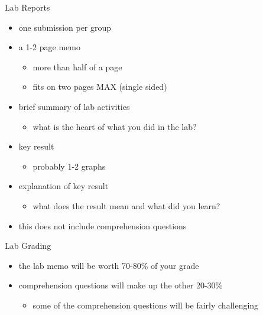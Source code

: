 \begin{frame}{Lab Reports}
\protect\hypertarget{lab-reports}{}
\begin{itemize}
\tightlist
\item
  one submission per group
\item
  a 1-2 page memo

  \begin{itemize}
  \tightlist
  \item
    more than half of a page
  \item
    fits on two pages MAX (single sided)
  \end{itemize}
\item
  brief summary of lab activities

  \begin{itemize}
  \tightlist
  \item
    what is the heart of what you did in the lab?
  \end{itemize}
\item
  key result

  \begin{itemize}
  \tightlist
  \item
    probably 1-2 graphs
  \end{itemize}
\item
  explanation of key result

  \begin{itemize}
  \tightlist
  \item
    what does the result mean and what did you learn?
  \end{itemize}
\item
  this does not include comprehension questions
\end{itemize}
\end{frame}

\begin{frame}{Lab Grading}
\protect\hypertarget{lab-grading}{}
\begin{itemize}
\tightlist
\item
  the lab memo will be worth 70-80\% of your grade
\item
  comprehension questions will make up the other 20-30\%

  \begin{itemize}
  \tightlist
  \item
    some of the comprehension questions will be fairly challenging
  \end{itemize}
\end{itemize}
\end{frame}

